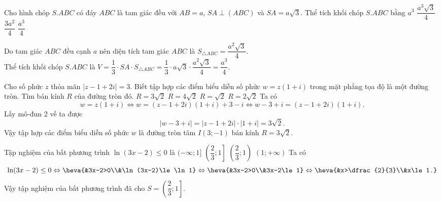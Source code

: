 \begin{ex}%
Cho hình chóp $S.ABC$ có đáy $ABC$ là tam giác đều với $AB=a$, $SA\perp(ABC)$ và $SA=a\sqrt{3}$. Thể tích khối chóp $S.ABC$ bằng
\choice
{$a^3$}
{$\dfrac{a^3\sqrt{3}}{4}$}
{$\dfrac{3a^2}{4}$}
{\True $\dfrac{a^3}{4}$}
\loigiai
{\immini
{Do tam giác $ABC$ đều cạnh $a$ nên diện tích tam giác $ABC$ là $S_{\triangle ABC}=\dfrac{a^2\sqrt{3}}{4}$.\\
Thể tích khối chóp $S.ABC$ là $V=\dfrac{1}{3}\cdot SA\cdot S_{\triangle ABC}=\dfrac{1}{3}\cdot a\sqrt{3}\cdot\dfrac{a^2\sqrt{3}}{4}=\dfrac{a^3}{4}$.
}
{
}
}
\end{ex}

\begin{ex}%
Cho số phức $z$ thỏa mãn $|z-1+2i|=3$. Biết tập hợp các điểm biểu diễn số phức $w=z(1+i)$ trong mặt phẳng tọa độ là một đường tròn. Tìm bán kính $R$ của đường tròn đó.
\choice
{\True $R=3\sqrt{2}$}
{$R=4\sqrt{2}$}
{$R=\sqrt{2}$}
{$R=2\sqrt{2}$}
\loigiai
{Ta có 
\[w=z(1+i)\Leftrightarrow w=(z-1+2i)(1+i)+3-i\Leftrightarrow w-3+i=(z-1+2i)(1+i).\]
Lấy mô-đun 2 vế ta được
\[|w-3+i|=|z-1+2i|\cdot |1+i|=3\sqrt{2}.\]
Vậy tập hợp các điểm biểu diễn số phức $w$ là đường tròn tâm $I(3;-1)$ bán kính $R=3\sqrt{2}$.
}
\end{ex}

\begin{ex}%
Tập nghiệm của bất phương trình $\ln(3x-2)\le 0$ là
\choice
{$(-\infty;1]$}
{\True $\left(\dfrac{2}{3};1\right]$}
{$\left(\dfrac{2}{3};1\right)$}
{$(1;+\infty) $}
\loigiai
{Ta có 
\[\ln(3x-2)\le 0\Leftrightarrow\heva{&3x-2>0\\&\ln(3x-2)\le \ln1}\Leftrightarrow\heva{&3x-2>0\\&3x-2\le 1}\Leftrightarrow\heva{&x>\dfrac{2}{3}\\&x\le 1.}\]
Vậy tập nghiệm của bất phương trình đã cho $S=\left(\dfrac{2}{3};1\right]$.
}
\end{ex}

